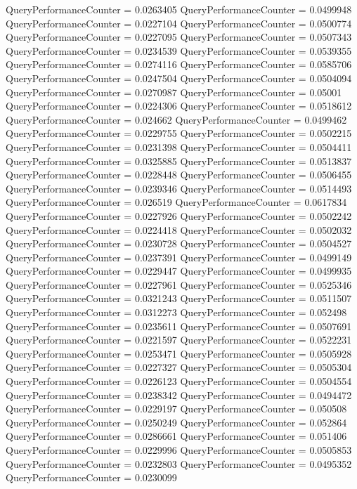 \documentclass[9pt]{article}
\theoremstyle{plain}
\theoremstyle{definition}
\theoremstyle{remark}
\numberwithin{equation}{section}
\begin{document}
QueryPerformanceCounter  =  0.0263405
QueryPerformanceCounter  =  0.0499948
QueryPerformanceCounter  =  0.0227104
QueryPerformanceCounter  =  0.0500774
QueryPerformanceCounter  =  0.0227095
QueryPerformanceCounter  =  0.0507343
QueryPerformanceCounter  =  0.0234539
QueryPerformanceCounter  =  0.0539355
QueryPerformanceCounter  =  0.0274116
QueryPerformanceCounter  =  0.0585706
QueryPerformanceCounter  =  0.0247504
QueryPerformanceCounter  =  0.0504094
QueryPerformanceCounter  =  0.0270987
QueryPerformanceCounter  =  0.05001
QueryPerformanceCounter  =  0.0224306
QueryPerformanceCounter  =  0.0518612
QueryPerformanceCounter  =  0.024662
QueryPerformanceCounter  =  0.0499462
QueryPerformanceCounter  =  0.0229755
QueryPerformanceCounter  =  0.0502215
QueryPerformanceCounter  =  0.0231398
QueryPerformanceCounter  =  0.0504411
QueryPerformanceCounter  =  0.0325885
QueryPerformanceCounter  =  0.0513837
QueryPerformanceCounter  =  0.0228448
QueryPerformanceCounter  =  0.0506455
QueryPerformanceCounter  =  0.0239346
QueryPerformanceCounter  =  0.0514493
QueryPerformanceCounter  =  0.026519
QueryPerformanceCounter  =  0.0617834
QueryPerformanceCounter  =  0.0227926
QueryPerformanceCounter  =  0.0502242
QueryPerformanceCounter  =  0.0224418
QueryPerformanceCounter  =  0.0502032
QueryPerformanceCounter  =  0.0230728
QueryPerformanceCounter  =  0.0504527
QueryPerformanceCounter  =  0.0237391
QueryPerformanceCounter  =  0.0499149
QueryPerformanceCounter  =  0.0229447
QueryPerformanceCounter  =  0.0499935
QueryPerformanceCounter  =  0.0227961
QueryPerformanceCounter  =  0.0525346
QueryPerformanceCounter  =  0.0321243
QueryPerformanceCounter  =  0.0511507
QueryPerformanceCounter  =  0.0312273
QueryPerformanceCounter  =  0.052498
QueryPerformanceCounter  =  0.0235611
QueryPerformanceCounter  =  0.0507691
QueryPerformanceCounter  =  0.0221597
QueryPerformanceCounter  =  0.0522231
QueryPerformanceCounter  =  0.0253471
QueryPerformanceCounter  =  0.0505928
QueryPerformanceCounter  =  0.0227327
QueryPerformanceCounter  =  0.0505304
QueryPerformanceCounter  =  0.0226123
QueryPerformanceCounter  =  0.0504554
QueryPerformanceCounter  =  0.0238342
QueryPerformanceCounter  =  0.0494472
QueryPerformanceCounter  =  0.0229197
QueryPerformanceCounter  =  0.050508
QueryPerformanceCounter  =  0.0250249
QueryPerformanceCounter  =  0.052864
QueryPerformanceCounter  =  0.0286661
QueryPerformanceCounter  =  0.051406
QueryPerformanceCounter  =  0.0229996
QueryPerformanceCounter  =  0.0505853
QueryPerformanceCounter  =  0.0232803
QueryPerformanceCounter  =  0.0495352
QueryPerformanceCounter  =  0.0230099
\end{document}

